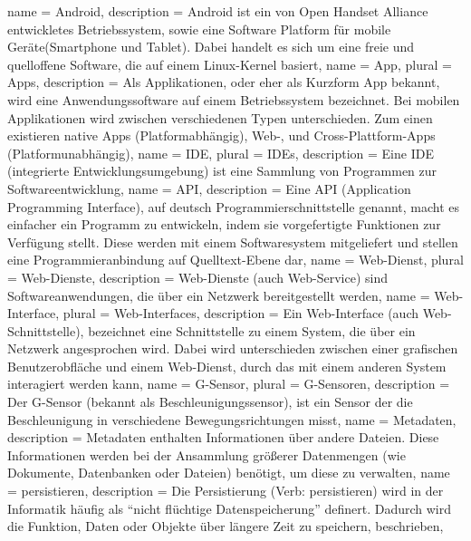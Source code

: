 \newpage
\printglossaries
{}
{
  name = Android,
  description = {Android ist ein von Open Handset Alliance entwickletes Betriebssystem, sowie eine Software Platform für mobile Geräte(\gls{Smartphone} und \gls{Tablet}). Dabei handelt es sich um eine freie und quelloffene Software, die auf einem Linux-Kernel basiert},
}
{
  name = App,
  plural = Apps,
  description = {Als Applikationen, oder eher als Kurzform App bekannt, wird eine Anwendungssoftware auf einem Betriebssystem bezeichnet. Bei mobilen Applikationen wird zwischen verschiedenen Typen unterschieden. Zum einen existieren native Apps (Platformabhängig), Web-, und Cross-Plattform-Apps (Platformunabhängig)},
}
{
	name = IDE,
	plural = IDEs,
	description = {Eine IDE (integrierte Entwicklungsumgebung) ist eine Sammlung von Programmen zur Softwareentwicklung},
}
{
  name = API,
  description = {Eine API (Application Programming Interface), auf deutsch Programmierschnittstelle genannt, macht es einfacher ein Programm zu entwickeln, indem sie vorgefertigte Funktionen zur Verfügung stellt. Diese werden mit einem Softwaresystem mitgeliefert und stellen eine Programmieranbindung auf Quelltext-Ebene dar},
}
{
  name = Web-Dienst,
  plural = Web-Dienste,
  description = {Web-Dienste (auch Web-Service) sind Softwareanwendungen, die über ein Netzwerk bereitgestellt werden},
}
{
  name = Web-Interface,
  plural = Web-Interfaces,
  description = {Ein Web-Interface (auch Web-Schnittstelle), bezeichnet eine Schnittstelle zu einem System, die über ein Netzwerk angesprochen wird. Dabei wird unterschieden zwischen einer grafischen Benutzerobfläche und einem \gls{Web-Dienst}, durch das mit einem anderen System interagiert werden kann},
}
{
  name = G-Sensor,
  plural = G-Sensoren,
  description = {Der G-Sensor (bekannt als Beschleunigungssensor), ist ein Sensor der die Beschleunigung in verschiedene Bewegungsrichtungen misst},
}
{
  name = Metadaten,
  description = {Metadaten enthalten Informationen über andere Dateien. Diese Informationen werden bei der Ansammlung größerer Datenmengen (wie Dokumente, Datenbanken oder Dateien) benötigt, um diese zu verwalten},
}
{
  name = persistieren,
  description = {Die Persistierung (Verb: persistieren) wird in der Informatik häufig als ``nicht flüchtige Datenspeicherung'' definert. Dadurch wird die Funktion, Daten oder Objekte über längere Zeit zu speichern, beschrieben},
}
